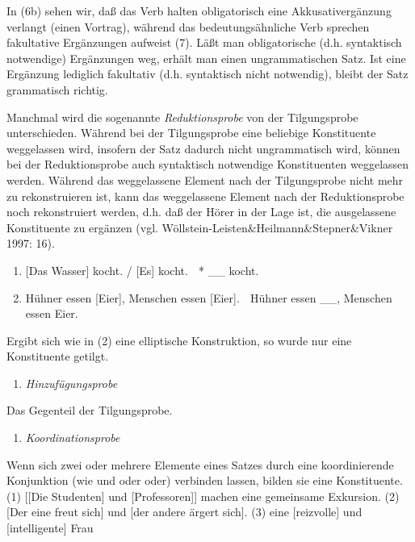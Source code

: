 \documentclass[
]{article}
\providecommand{\tightlist}{%
  \setlength{\itemsep}{0pt}\setlength{\parskip}{0pt}}
\begin{document}
In (6b) sehen wir, daß das Verb halten obligatorisch eine Akkusativergänzung verlangt (einen Vortrag), während das bedeutungsähnliche Verb sprechen fakultative Ergänzungen aufweist (7). Läßt man obligatorische (d.h. syntaktisch notwendige) Ergänzungen weg, erhält man einen ungrammatischen Satz. Ist eine Ergänzung lediglich fakultativ (d.h. syntaktisch nicht notwendig), bleibt der Satz grammatisch richtig.

Manchmal wird die sogenannte \emph{Reduktionsprobe} von der Tilgungsprobe unterschieden. Während bei der Tilgungsprobe eine beliebige Konstituente weggelassen wird, insofern der Satz dadurch nicht ungrammatisch wird, können bei der Reduktionsprobe auch syntaktisch notwendige Konstituenten weggelassen werden. Während das weggelassene Element nach der Tilgungsprobe nicht mehr zu rekonstruieren ist, kann das weggelassene Element nach der Reduktionsprobe noch rekonstruiert werden, d.h. daß der Hörer in der Lage ist, die ausgelassene Konstituente zu ergänzen (vgl. Wöllstein-Leisten\&Heilmann\&Stepner\&Vikner 1997: 16).

\begin{enumerate}
\def\labelenumi{(\arabic{enumi})}
\tightlist
\item
  {[}Das Wasser{]} kocht. / {[}Es{]} kocht.  * \_\_ kocht.
\item
  Hühner essen {[}Eier{]}, Menschen essen {[}Eier{]}.  Hühner essen \_\_, Menschen essen Eier.
\end{enumerate}

Ergibt sich wie in (2) eine elliptische Konstruktion, so wurde nur eine Konstituente getilgt.

\begin{enumerate}
\def\labelenumi{\arabic{enumi}.}
\setcounter{enumi}{3}
\tightlist
\item
  \emph{Hinzufügungsprobe}
\end{enumerate}

Das Gegenteil der Tilgungsprobe.

\begin{enumerate}
\def\labelenumi{\arabic{enumi}.}
\setcounter{enumi}{4}
\tightlist
\item
  \emph{Koordinationsprobe}
\end{enumerate}

Wenn sich zwei oder mehrere Elemente eines Satzes durch eine koordinierende Konjunktion (wie und oder oder) verbinden lassen, bilden sie eine Konstituente.
(1) {[}{[}Die Studenten{]} und {[}Professoren{]}{]} machen eine gemeinsame Exkursion.
(2) {[}Der eine freut sich{]} und {[}der andere ärgert sich{]}.
(3) eine {[}reizvolle{]} und {[}intelligente{]} Frau
\end{document}
